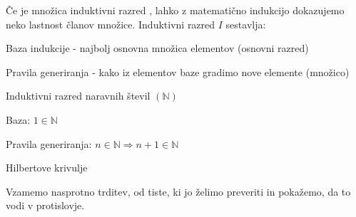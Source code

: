 Če je množica induktivni razred%
, lahko z matematično indukcijo dokazujemo neko lastnost članov množice. Induktivni razred $I$ sestavlja:
\begin{items}
\item Baza indukcije - najbolj osnovna množica elementov (osnovni razred)
\item Pravila generiranja - kako iz elementov baze gradimo nove elemente (množico)
\end{items}
\begin{primeri}
\item Induktivni razred naravnih števil $(\mathbb{N})$
	\begin{items}
	\item Baza: $1 \in \mathbb{N}$ 
	\item Pravila generiranja: $n \in \mathbb{N} \Longrightarrow n+1 \in \mathbb{N} $
	\end{items}
\item Hilbertove krivulje \fixme
\end{primeri}

Vzamemo nasprotno trditev, od tiste, ki jo želimo preveriti in pokažemo, da to vodi v protislovje.

